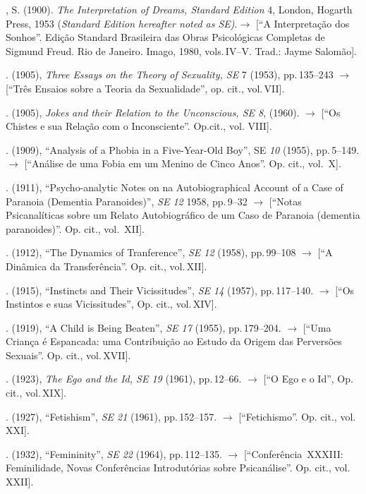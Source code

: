 \begin{bibliohedra}
, S. (1900). \textit{The Interpretation of Dreams, Standard Edition }4,
London, Hogarth Press, 1953 (\textit{Standard Edition hereafter noted as
SE)}.{$\bm{\rightarrow}$} [``A Interpretação dos Sonhos''. Edição
Standard Brasileira das Obras Psicológicas Completas de Sigmund Freud. Rio de
Janeiro. Imago, 1980, vols.\,IV--V. Trad.: Jayme Salomão].

. (1905), \textit{Three Essays on the Theory of Sexuality, SE
}7\textit{ } (1953), pp.\,135--243 {$\bm{\rightarrow}$} [``Três Ensaios sobre a Teoria da
Sexualidade'', op. cit., vol.\,VII].

. (1905), \textit{Jokes and their Relation to the Unconscious,
SE 8}, (1960). {$\bm{\rightarrow}$} [``Os Chistes e sua Relação com o Inconsciente''.
Op.cit., vol. VIII].

. (1909), ``Analysis of a Phobia in a Five-Year-Old
Boy'', SE \textit{10} (1955), pp.\,5--149. {$\bm{\rightarrow}$} [``Análise de
uma Fobia em um Menino de Cinco Anos''. Op. cit., vol.~X].

. (1911), ``Psycho-analytic Notes on na
Autobiographical Account of a Case of Paranoia (Dementia
Paranoides)'', \textit{SE 12 }1958, pp.\,9--32 {$\bm{\rightarrow}$} [``Notas
Psicanalíticas sobre um Relato Autobiográfico de um Caso de Paranoia (dementia
paranoides)''. Op. cit., vol.~XII].

. (1912), ``The Dynamics of
Tranference'', \textit{SE 12 }(1958), pp.\,99--108 {$\bm{\rightarrow}$} [``A
Dinâmica da Transferência''. Op. cit., vol.\,XII].

. (1915), ``Instincts and Their
Vicissitudes'', \textit{SE 14 }(1957), pp.\,117--140.
{$\bm{\rightarrow}$} [``Os Instintos e suas Vicissitudes'', Op. cit., vol.\,XIV].

. (1919), ``A Child is Being Beaten'',
\textit{SE 17 }(1955), pp.\,179--204. {$\bm{\rightarrow}$} [``Uma Criança
é Espancada: uma Contribuição ao Estudo da Origem das Perversões
Sexuais''. Op. cit., vol.\,XVII].

. (1923), \textit{The Ego and the Id, SE 19 }(1961), pp.\,12--66.
{$\bm{\rightarrow}$} [``O Ego e o Id'', Op. cit., vol.\,XIX].

. (1927), ``Fetishism'', \textit{SE 21
}(1961), pp.\,152--157. {$\bm{\rightarrow}$} [``Fetichismo''. Op. cit., vol.\,XXI].

. (1932), ``Femininity'', \textit{SE
22 }(1964), pp.\,112--135. {$\bm{\rightarrow}$} [``Conferência~XXXIII: Feminilidade, Novas
Conferências Introdutórias sobre Psicanálise''. Op. cit., vol.\,XXII].


\end{bibliohedra}
